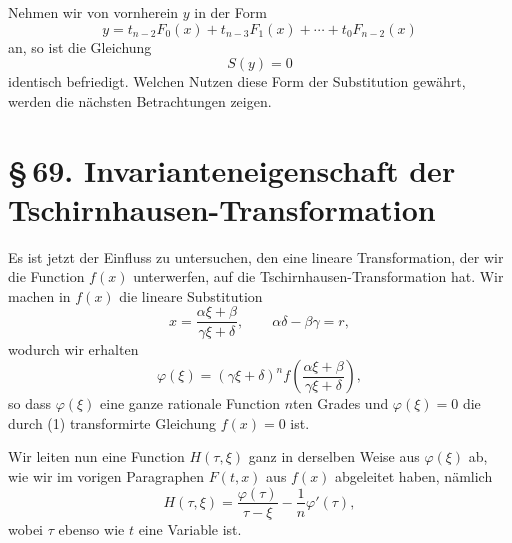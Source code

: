 \documentclass[11pt]{article}
\providecommand{\sect}[2]{\section*{\S\,#1. #2}}
\begin{document}
Nehmen wir von vornherein $y$ in der Form
\begin{equation}
 y=t_{n-2}F_0(x)+t_{n-3}F_1(x)+\cdots+t_0F_{n-2}(x)
\tag{12}
\end{equation}
an, so ist die Gleichung
\begin{equation}
 S(y)=0
\tag{13}
\end{equation}
identisch befriedigt. Welchen Nutzen diese Form der Substitution gewährt, werden die nächsten Betrachtungen zeigen.

\sect{69}{Invarianteneigenschaft der Tschirnhausen-Transformation}

Es ist jetzt der Einfluss zu untersuchen, den eine lineare Transformation, der wir die Function $f(x)$ unterwerfen, auf die Tschirnhausen-Transformation hat. Wir machen in $f(x)$ die lineare Substitution
\begin{equation}
 x=\frac{\alpha\xi+\beta}{\gamma\xi+\delta},
 \qquad
 \alpha\delta-\beta\gamma=r,
\tag{1}
\end{equation}
wodurch wir erhalten
\begin{equation}
 \varphi(\xi)=(\gamma\xi+\delta)^n f\!\left(\frac{\alpha\xi+\beta}{\gamma\xi+\delta}\right),
\tag{2}
\end{equation}
so dass $\varphi(\xi)$ eine ganze rationale Function $n$ten Grades und $\varphi(\xi)=0$ die durch (1) transformirte Gleichung $f(x)=0$ ist.

Wir leiten nun eine Function $H(\tau,\xi)$ ganz in derselben Weise aus $\varphi(\xi)$ ab, wie wir im vorigen Paragraphen $F(t,x)$ aus $f(x)$ abgeleitet haben, nämlich
\begin{equation}
 H(\tau,\xi)=\frac{\varphi(\tau)}{\tau-\xi}-\frac1n\varphi'(\tau),
\tag{3}
\end{equation}
wobei $\tau$ ebenso wie $t$ eine Variable ist.
\end{document}
